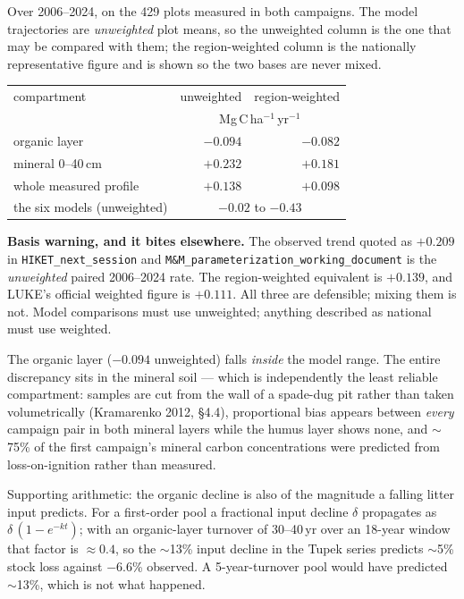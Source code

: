 \documentclass[11pt]{article}
\begin{document}
\noindent Over 2006--2024, on the 429 plots measured in both campaigns. The model trajectories are
\emph{unweighted} plot means, so the unweighted column is the one that may be compared with them;
the region-weighted column is the nationally representative figure and is shown so the two bases
are never mixed.

\begin{center}\small
\begin{tabular}{lrr}
\toprule
compartment & unweighted & region-weighted\\
 & \multicolumn{2}{c}{Mg\,C\,ha$^{-1}$\,yr$^{-1}$}\\
\midrule
organic layer & $-0.094$ & $-0.082$\\
mineral 0--40\,cm & $+0.232$ & $+0.181$\\
whole measured profile & $+0.138$ & $+0.098$\\
\midrule
the six models (unweighted) & \multicolumn{2}{c}{$-0.02$ to $-0.43$}\\
\bottomrule
\end{tabular}
\end{center}

\begin{caveat}
\textbf{Basis warning, and it bites elsewhere.} The observed trend quoted as $+0.209$ in
\texttt{HIKET\_next\_session} and \texttt{M\&M\_parameterization\_working\_document} is the
\emph{unweighted} paired 2006--2024 rate. The region-weighted equivalent is $+0.139$, and LUKE's
official weighted figure is $+0.111$. All three are defensible; mixing them is not. Model
comparisons must use unweighted; anything described as national must use weighted.
\end{caveat}

\noindent The organic layer ($-0.094$ unweighted) falls \emph{inside} the model range. The entire discrepancy sits
in the mineral soil --- which is independently the least reliable compartment: samples are
cut from the wall of a spade-dug pit rather than taken volumetrically
(Kramarenko 2012, \S4.4), proportional bias appears between \emph{every} campaign pair in
both mineral layers while the humus layer shows none, and $\sim$75\% of the first
campaign's mineral carbon concentrations were predicted from loss-on-ignition rather than
measured.

\medskip
\noindent Supporting arithmetic: the organic decline is also of the magnitude a falling
litter input predicts. For a first-order pool a fractional input decline $\delta$
propagates as $\delta\,(1-e^{-kt})$; with an organic-layer turnover of 30--40\,yr over an
18-year window that factor is $\approx 0.4$, so the $\sim$13\% input decline in the Tupek
series predicts $\sim$5\% stock loss against $-6.6$\% observed. A 5-year-turnover pool
would have predicted $\sim$13\%, which is not what happened.
\end{document}
